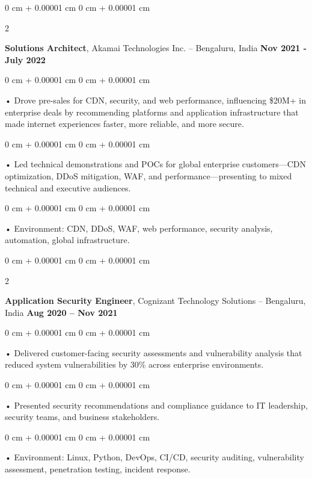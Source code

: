 \documentclass[10pt, letterpaper]{article}
\newenvironment{onecolentry}{
    \begin{adjustwidth}{
        0 cm + 0.00001 cm
    }{
        0 cm + 0.00001 cm
    }
}{
    \end{adjustwidth}
} %
\newenvironment{twocolentry}[2][]{
    \onecolentry
    \def\secondColumn{#2}
    \setcolumnwidth{\fill, 4.5 cm}
    \begin{paracol}{2}
}{
    \switchcolumn \raggedleft \secondColumn
    \end{paracol}
    \endonecolentry
} %
\begin{document}
        \begin{twocolentry}{
            \textbf{Nov 2021 - July 2022}
        }
            \textbf{Solutions Architect}, Akamai Technologies Inc. -- Bengaluru, India \end{twocolentry}
        \begin{onecolentry}
            • Drove pre-sales for CDN, security, and web performance, influencing \$20M+ in enterprise deals by recommending platforms and application infrastructure that made internet experiences faster, more reliable, and more secure.
        \end{onecolentry}
        \begin{onecolentry}
            • Led technical demonstrations and POCs for global enterprise customers---CDN optimization, DDoS mitigation, WAF, and performance---presenting to mixed technical and executive audiences.
        \end{onecolentry}
        \begin{onecolentry}
             • Environment: CDN, DDoS, WAF, web performance, security analysis, automation, global infrastructure.
        \end{onecolentry}

        \begin{twocolentry}{
            \textbf{Aug 2020 – Nov 2021}
        }
            \vspace{2 pt }
            \textbf{Application Security Engineer}, Cognizant Technology Solutions -- Bengaluru, India\end{twocolentry}
        \begin{onecolentry}
             • Delivered customer-facing security assessments and vulnerability analysis that reduced system vulnerabilities by 30\% across enterprise environments.
        \end{onecolentry}
        \begin{onecolentry}
             • Presented security recommendations and compliance guidance to IT leadership, security teams, and business stakeholders.
        \end{onecolentry}

        \begin{onecolentry}
             • Environment: Linux, Python, DevOps, CI/CD, security auditing, vulnerability assessment, penetration testing, incident response.
        \end{onecolentry}
    \vspace{2 pt }
\end{document}
